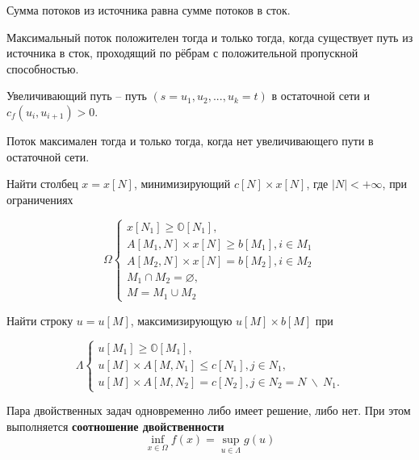 	\begin{Lm}
		Сумма потоков из источника равна сумме потоков в сток.
	\end{Lm}

	\begin{Lm}
		Максимальный поток положителен тогда и только тогда, когда существует путь из источника в сток, проходящий по рёбрам с положительной пропускной способностью.
	\end{Lm}

	\begin{Def}
		Увеличивающий путь -- путь $(s = u_1, u_2, ..., u_k = t)$ в остаточной сети и $c_f(u_i, u_{i+1}) > 0$. 
	\end{Def}

	\begin{Thm}
		Поток максимален тогда и только тогда, когда нет увеличивающего пути в остаточной сети.
	\end{Thm}

	\begin{Def}
		Найти столбец $x = x[N]$, минимизирующий $c[N] \times x[N]$, где $|N| < + \infty$, при ограничениях 

		$$\Omega \begin{cases}
			x[N_1] \geqslant \mathbb{O}[N_1],\\
			A[M_1, N] \times x[N] \geqslant b[M_1], i \in M_1\\
			A[M_2, N] \times x[N] = b[M_2], i \in M_2 \\
			M_1 \cap M_2 = \varnothing,\\
			M = M_1 \cup M_2
		\end{cases}$$
	\end{Def}

	\begin{Def}
		Найти строку $u = u[M]$, максимизирующую $u[M] \times b[M]$ при 

		$$\Lambda \begin{cases}
			u[M_1] \geqslant \mathbb{O}[M_1],\\
			u[M] \times A[M, N_1] \leqslant c[N_1], j \in N_1,\\
			u[M] \times A[M, N_2] = c[N_2], j \in N_2 = N \ \backslash \ N_1.
		\end{cases}
		$$ 
		
	\end{Def}

	\begin{Thm}
		Пара двойственных задач одновременно либо имеет решение, либо нет.
		При этом выполняется \textbf{соотношение двойственности}
		$$ \inf_{x\in \Omega} f(x) = \sup_{u \in \Lambda} g(u)$$
	\end{Thm}

